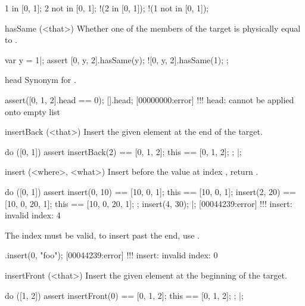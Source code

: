 \begin{urbiscriptapi}
\begin{urbiassert}
  1 in     [0, 1];
  2 not in [0, 1];
!(2 in     [0, 1]);
!(1 not in [0, 1]);
\end{urbiassert}

\item[hasSame](<that>)%
  Whether one of the members of the target is physically equal to
  .
\begin{urbiscript}
var y = 1|;
assert
{
   [0, y, 2].hasSame(y);
  ![0, y, 2].hasSame(1);
};
\end{urbiscript}

\item[head]
  Synonym for .
\begin{urbiscript}
assert([0, 1, 2].head == 0);
[].head;
[00000000:error] !!! head: cannot be applied onto empty list
\end{urbiscript}

\item[insertBack](<that>)%
  Insert the given element at the end of the target.

\begin{urbiscript}
do ([0, 1])
{
  assert
  {
    insertBack(2) == [0, 1, 2];
    this          == [0, 1, 2];
  };
}|;
\end{urbiscript}

\item[insert](<where>, <what>)%
  Insert  before the value at index , return
  \this.
\begin{urbiscript}
do ([0, 1])
{
  assert
  {
    insert(0, 10) == [10, 0, 1];
    this          == [10, 0, 1];
    insert(2, 20) == [10, 0, 20, 1];
    this          == [10, 0, 20, 1];
  };
  insert(4, 30);
}|;
[00044239:error] !!! insert: invalid index: 4
\end{urbiscript}

  The index must be valid, to insert past the end, use .
\begin{urbiscript}
[].insert(0, "foo");
[00044239:error] !!! insert: invalid index: 0
\end{urbiscript}


\item[insertFront](<that>)%
  Insert the given element at the beginning of the target.

\begin{urbiscript}
do ([1, 2])
{
  assert
  {
    insertFront(0) == [0, 1, 2];
    this           == [0, 1, 2];
  };
}|;
\end{urbiscript}


\end{urbiscriptapi}
